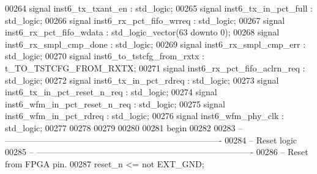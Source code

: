 \begin{DoxyCode}
00264 \textcolor{keywordflow}{signal} \textcolor{vhdlchar}{inst6_tx_txant_en}            \textcolor{vhdlchar}{:} \textcolor{comment}{std\_logic};
00265 \textcolor{keywordflow}{signal} \textcolor{vhdlchar}{inst6_tx_in_pct_full}         \textcolor{vhdlchar}{:} \textcolor{comment}{std\_logic};
00266 \textcolor{keywordflow}{signal} \textcolor{vhdlchar}{inst6_rx_pct_fifo_wrreq}      \textcolor{vhdlchar}{:} \textcolor{comment}{std\_logic};
00267 \textcolor{keywordflow}{signal} \textcolor{vhdlchar}{inst6_rx_pct_fifo_wdata}      \textcolor{vhdlchar}{:} \textcolor{comment}{std\_logic\_vector}\textcolor{vhdlchar}{(}\textcolor{vhdllogic}{}\textcolor{vhdllogic}{63} \textcolor{keywordflow}{downto} \textcolor{vhdllogic}{}\textcolor{vhdllogic}{0}\textcolor{vhdlchar}{)};
00268 \textcolor{keywordflow}{signal} \textcolor{vhdlchar}{inst6_rx_smpl_cmp_done}       \textcolor{vhdlchar}{:} \textcolor{comment}{std\_logic};
00269 \textcolor{keywordflow}{signal} \textcolor{vhdlchar}{inst6_rx_smpl_cmp_err}        \textcolor{vhdlchar}{:} \textcolor{comment}{std\_logic};
00270 \textcolor{keywordflow}{signal} \textcolor{vhdlchar}{inst6_to_tstcfg_from_rxtx}    \textcolor{vhdlchar}{:} \textcolor{vhdlchar}{t_TO_TSTCFG_FROM_RXTX};
00271 \textcolor{keywordflow}{signal} \textcolor{vhdlchar}{inst6_rx_pct_fifo_aclrn_req}  \textcolor{vhdlchar}{:} \textcolor{comment}{std\_logic};
00272 \textcolor{keywordflow}{signal} \textcolor{vhdlchar}{inst6_tx_in_pct_rdreq}        \textcolor{vhdlchar}{:} \textcolor{comment}{std\_logic};
00273 \textcolor{keywordflow}{signal} \textcolor{vhdlchar}{inst6_tx_in_pct_reset_n_req}  \textcolor{vhdlchar}{:} \textcolor{comment}{std\_logic};
00274 \textcolor{keywordflow}{signal} \textcolor{vhdlchar}{inst6_wfm_in_pct_reset_n_req} \textcolor{vhdlchar}{:} \textcolor{comment}{std\_logic};
00275 \textcolor{keywordflow}{signal} \textcolor{vhdlchar}{inst6_wfm_in_pct_rdreq}       \textcolor{vhdlchar}{:} \textcolor{comment}{std\_logic};
00276 \textcolor{keywordflow}{signal} \textcolor{vhdlchar}{inst6_wfm_phy_clk}            \textcolor{vhdlchar}{:} \textcolor{comment}{std\_logic};
00277 
00278 
00279 
00280 
00281 \textcolor{vhdlkeyword}{begin}
00282    
00283 \textcolor{keyword}{-- ----------------------------------------------------------------------------}
00284 \textcolor{keyword}{-- Reset logic}
00285 \textcolor{keyword}{-- ----------------------------------------------------------------------------  }
00286 \textcolor{keyword}{   -- Reset from FPGA pin. }
00287    \textcolor{vhdlchar}{reset_n} \textcolor{vhdlchar}{<=} \textcolor{keywordflow}{not} \textcolor{vhdlchar}{EXT_GND};

\end{DoxyCode}
